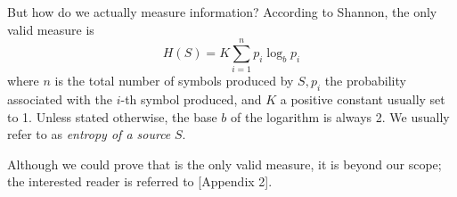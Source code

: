 \documentclass{subfiles}
\begin{document}
    But how do we actually measure information? According to Shannon, 
        the only valid measure is 
        \begin{equation}\label{eq:shannonEntropy}
            H(S) = K \sum_{i = 1}^{n} {p_{i} \log_{b} p_{i}}
        \end{equation}
        where \(n\) is the total number of symbols produced by \(S, p_{i}\)
        the probability associated with the \(i\)-th symbol produced, and \(K\) a 
        positive constant usually set to 1.
        Unless stated otherwise, the base \(b\) of the logarithm is always 2.
        We usually refer to  as \emph{entropy of a source} \(S\).
    
    Although we could prove that  is the only valid measure,
        it is beyond our scope; the interested reader is referred to \cite{shannon1948}[Appendix 2].
\end{document}
